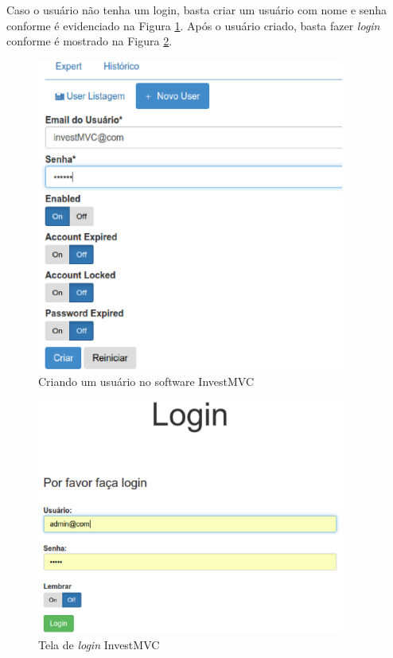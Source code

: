 Caso o usuário não tenha um login, basta criar um usuário com nome e senha conforme é evidenciado na Figura \ref{novoUser}. Após o usuário criado, basta fazer \textit{login} conforme é mostrado na Figura \ref{login}.

\begin{figure}[H]
\centering
\includegraphics[width=0.9\textwidth]{figuras/novoUser}
\caption{Criando um usuário no software InvestMVC}
\label{novoUser}
\end{figure}

\begin{figure}[H]
\centering
\includegraphics[width=0.9\textwidth]{figuras/login}
\caption{Tela de \textit{login} InvestMVC}
\label{login}
\end{figure}

